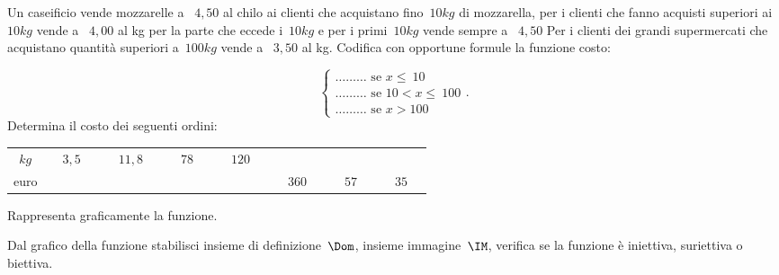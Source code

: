\begin{esercizio}
\label{ese:D.63}
Un caseificio vende mozzarelle a \officialeuro\ $4,50$ al chilo ai clienti che 
acquistano fino~$10\unit{kg}$ di mozzarella, per i clienti che
fanno acquisti superiori ai~$10\unit{kg}$ vende a \officialeuro\ $4,00$ al kg 
per la parte che eccede i~$10\unit{kg}$ e per i primi~$10\unit{kg}$
vende sempre a \officialeuro\ $4,50$ Per i clienti dei grandi supermercati che 
acquistano quantità superiori a~$100\unit{kg}$ vende a \officialeuro\ $3,50$
al kg. Codifica con opportune formule la funzione costo:

\[\left\{\begin{array}{l}
\ldots\ldots\ldots \text{ se } x \le~10\\
\ldots\ldots\ldots \text{ se } 10< x \le~100\\
\ldots\ldots\ldots \text{ se } x > 100\end{array}\right..
\]
Determina il costo dei seguenti ordini:
\begin{center}
 \begin{tabular}{cccccccc}
  \toprule
  $\unit{kg}$ & $ \quad 3,5 \quad $ & $ \quad 11,8 \quad $ & $ \quad 78 \quad $ 
& $ \quad 120 
\quad $ & & &\\
  euro& & & & & $ \quad 360 \quad $ & $ \quad 57 \quad $ & $ \quad 35 \quad $\\
  \bottomrule
 \end{tabular}
\end{center}

Rappresenta graficamente la funzione.
\end{esercizio}

\begin{esercizio}
\label{ese:D.64}
Dal grafico della funzione stabilisci insieme di definizione~$\Dom$, insieme 
immagine~$\IM$, verifica se la funzione è iniettiva, suriettiva o biettiva.
\begin{center}
 
\end{center}

\end{esercizio}

